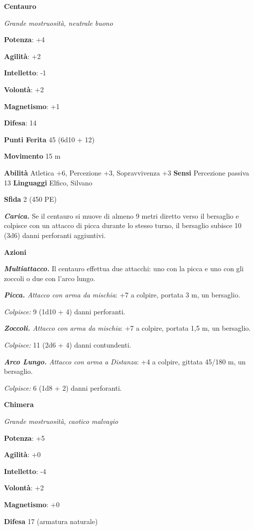 \begin{multicols}{2}
\textbf{Centauro}

\emph{Grande mostruosità, neutrale buono}

\textbf{Potenza}: +4

\textbf{Agilità}: +2

\textbf{Intelletto}: -1

\textbf{Volontà}: +2

\textbf{Magnetismo}: +1

\textbf{Difesa}: 14

\textbf{Punti Ferita} 45 (6d10 + 12)

\textbf{Movimento} 15 m

\textbf{Abilità} Atletica +6, Percezione +3, Sopravvivenza +3
\textbf{Sensi} Percezione passiva 13 \textbf{Linguaggi} Elfico, Silvano

\textbf{Sfida} 2 (450 PE)

\emph{\textbf{Carica.}} Se il centauro si muove di almeno 9 metri
diretto verso il bersaglio e colpisce con un attacco di picca durante lo
stesso turno, il bersaglio subisce 10 (3d6) danni perforanti aggiuntivi.

\textbf{Azioni}

\emph{\textbf{Multiattacco.}} Il centauro effettua due attacchi: uno con
la picca e uno con gli zoccoli o due con l'arco lungo.

\emph{\textbf{Picca.} Attacco con arma da mischia}: +7 a colpire,
portata 3 m, un bersaglio.

\emph{Colpisce:} 9 (1d10 + 4) danni perforanti.

\emph{\textbf{Zoccoli.} Attacco con arma da mischia}: +7 a colpire,
portata 1,5 m, un bersaglio.

\emph{Colpisce:} 11 (2d6 + 4) danni contundenti.

\emph{\textbf{Arco Lungo.} Attacco con arma a Distanza}: +4 a colpire,
gittata 45/180 m, un bersaglio.

\emph{Colpisce:} 6 (1d8 + 2) danni perforanti.



\textbf{Chimera}

\emph{Grande mostruosità, caotico malvagio}

\textbf{Potenza}: +5

\textbf{Agilità}: +0

\textbf{Intelletto}: -4

\textbf{Volontà}: +2

\textbf{Magnetismo}: +0

\textbf{Difesa} 17 (armatura naturale)


\end{multicols}
